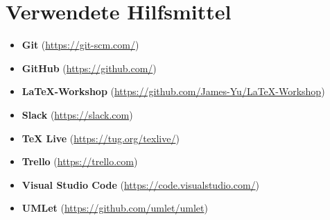 
\section*{Verwendete Hilfsmittel}

\begin{itemize}
    \item \textbf{Git} (\url{https://git-scm.com/})
    \item \textbf{GitHub} (\url{https://github.com/})
    \item \textbf{LaTeX-Workshop} (\url{https://github.com/James-Yu/LaTeX-Workshop})
    \item \textbf{Slack} (\url{https://slack.com})
    \item \textbf{TeX Live} (\url{https://tug.org/texlive/})
    \item \textbf{Trello} (\url{https://trello.com})
    \item \textbf{Visual Studio Code} (\url{https://code.visualstudio.com/})
    \item \textbf{UMLet} (\url{https://github.com/umlet/umlet})
\end{itemize}